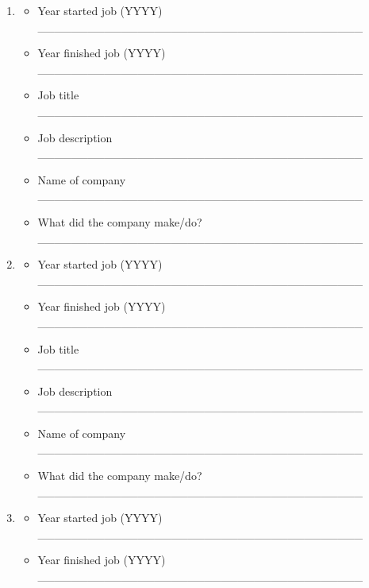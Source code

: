 \documentclass[a4paper,10pt]{article}
\begin{document}
\begin{enumerate}
 \item
     \begin{itemize}
         \item Year started job (YYYY) \_\_\_\_\_\_\_\_\_\_\_\_\_\_\_\_\_\_\_\_\_\_\_\_\_\_\_\_\_\_\_\_\_\_\_\_\_\_\_ 
         \item Year finished job (YYYY) \_\_\_\_\_\_\_\_\_\_\_\_\_\_\_\_\_\_\_\_\_\_\_\_\_\_\_\_\_\_\_\_\_\_\_\_\_\_\_
         \item Job title \_\_\_\_\_\_\_\_\_\_\_\_\_\_\_\_\_\_\_\_\_\_\_\_\_\_\_\_\_\_\_\_\_\_\_\_\_\_\_
         \item Job description \_\_\_\_\_\_\_\_\_\_\_\_\_\_\_\_\_\_\_\_\_\_\_\_\_\_\_\_\_\_\_\_\_\_\_\_\_\_\_
         \item Name of company \_\_\_\_\_\_\_\_\_\_\_\_\_\_\_\_\_\_\_\_\_\_\_\_\_\_\_\_\_\_\_\_\_\_\_\_\_\_\_
         \item What did the company make/do? \_\_\_\_\_\_\_\_\_\_\_\_\_\_\_\_\_\_\_\_\_\_\_\_\_\_\_\_\_\_\_\_\_\_\_\_\_\_\_
      \end{itemize}
 \item
     \begin{itemize}
         \item Year started job (YYYY) \_\_\_\_\_\_\_\_\_\_\_\_\_\_\_\_\_\_\_\_\_\_\_\_\_\_\_\_\_\_\_\_\_\_\_\_\_\_\_ 
         \item Year finished job (YYYY) \_\_\_\_\_\_\_\_\_\_\_\_\_\_\_\_\_\_\_\_\_\_\_\_\_\_\_\_\_\_\_\_\_\_\_\_\_\_\_
         \item Job title \_\_\_\_\_\_\_\_\_\_\_\_\_\_\_\_\_\_\_\_\_\_\_\_\_\_\_\_\_\_\_\_\_\_\_\_\_\_\_
         \item Job description \_\_\_\_\_\_\_\_\_\_\_\_\_\_\_\_\_\_\_\_\_\_\_\_\_\_\_\_\_\_\_\_\_\_\_\_\_\_\_
         \item Name of company \_\_\_\_\_\_\_\_\_\_\_\_\_\_\_\_\_\_\_\_\_\_\_\_\_\_\_\_\_\_\_\_\_\_\_\_\_\_\_
         \item What did the company make/do? \_\_\_\_\_\_\_\_\_\_\_\_\_\_\_\_\_\_\_\_\_\_\_\_\_\_\_\_\_\_\_\_\_\_\_\_\_\_\_
      \end{itemize}
 \item
     \begin{itemize}
         \item Year started job (YYYY) \_\_\_\_\_\_\_\_\_\_\_\_\_\_\_\_\_\_\_\_\_\_\_\_\_\_\_\_\_\_\_\_\_\_\_\_\_\_\_ 
         \item Year finished job (YYYY) \_\_\_\_\_\_\_\_\_\_\_\_\_\_\_\_\_\_\_\_\_\_\_\_\_\_\_\_\_\_\_\_\_\_\_\_\_\_\_

\end{itemize}
\end{enumerate}
\end{document}
